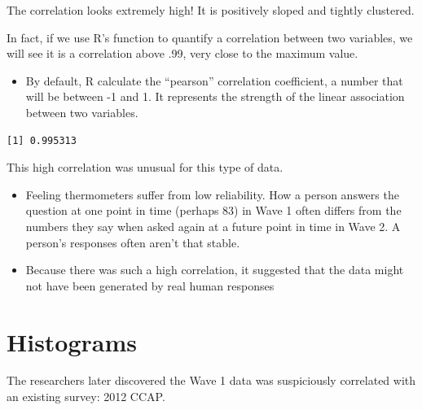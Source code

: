 \documentclass[
  letterpaper,
  DIV=11,
  numbers=noendperiod]{scrreprt}
\newenvironment{Shaded}{\begin{snugshade}}{\end{snugshade}}
\newcommand{\AttributeTok}[1]{\textcolor[rgb]{0.40,0.45,0.13}{#1}}
\newcommand{\DocumentationTok}[1]{\textcolor[rgb]{0.37,0.37,0.37}{\textit{#1}}}
\newcommand{\FunctionTok}[1]{\textcolor[rgb]{0.28,0.35,0.67}{#1}}
\newcommand{\NormalTok}[1]{\textcolor[rgb]{0.00,0.23,0.31}{#1}}
\newcommand{\SpecialCharTok}[1]{\textcolor[rgb]{0.37,0.37,0.37}{#1}}
\newcommand{\StringTok}[1]{\textcolor[rgb]{0.13,0.47,0.30}{#1}}
\providecommand{\tightlist}{%
  \setlength{\itemsep}{0pt}\setlength{\parskip}{0pt}}\usepackage{longtable,booktabs,array}
\begin{document}
The correlation looks extremely high! It is positively sloped and
tightly clustered.

In fact, if we use R's function to quantify a correlation between two
variables, we will see it is a correlation above .99, very close to the
maximum value.

\begin{itemize}
\tightlist
\item
  By default, R calculate the ``pearson'' correlation coefficient, a
  number that will be between -1 and 1. It represents the strength of
  the linear association between two variables.
\end{itemize}

\begin{Shaded}
\end{Shaded}

\begin{verbatim}
[1] 0.995313
\end{verbatim}

This high correlation was unusual for this type of data.

\begin{itemize}
\tightlist
\item
  Feeling thermometers suffer from low reliability. How a person answers
  the question at one point in time (perhaps 83) in Wave 1 often differs
  from the numbers they say when asked again at a future point in time
  in Wave 2. A person's responses often aren't that stable.
\item
  Because there was such a high correlation, it suggested that the data
  might not have been generated by real human responses
\end{itemize}

\hypertarget{histograms}{%
\section{Histograms}\label{histograms}}

The researchers later discovered the Wave 1 data was suspiciously
correlated with an existing survey: 2012 CCAP.
\end{document}
